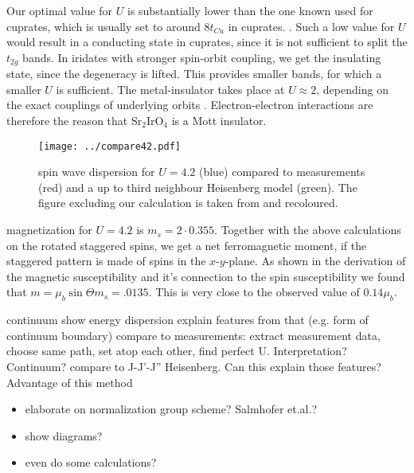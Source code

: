\documentclass[a4paper,12pt]{report}
\begin{document}
Our optimal value for $U$ is substantially lower than the one known used for cuprates, which is usually set to around 8$t_{Cu}$ in cuprates. 
.
Such a low value for $U$ would result in a conducting state in cuprates, since it is not sufficient to split the $t_{2g}$ bands. 
In iridates with stronger spin-orbit coupling, we get the insulating state, since the degeneracy is lifted.
This provides smaller bands, for which a smaller $U$ is sufficient.
The metal-insulator takes place at $U \approx 2$, depending on the exact couplings of underlying orbits \cite{PhysRevB.88.035111}.
Electron-electron interactions are therefore the reason that Sr$_2$IrO$_4$ is a Mott insulator. 
\begin{figure}
 \begin{center}
  \texttt{[image: ../compare42.pdf]}
 \caption{ spin wave dispersion for $U=4.2$ (blue) compared to measurements (red) and a up to third neighbour Heisenberg model (green). 
 The figure excluding our calculation is taken from \cite{PhysRevLett.108.177003} and recoloured.} 
 \end{center}
\label{tttU42}
\end{figure}


magnetization for $U=4.2$ is $m_s= 2\cdot 0.355$. Together with the above calculations on the rotated staggered spins, we get a net ferromagnetic moment,
if the staggered pattern is made of spins in the $x$-$y$-plane. As shown in the derivation of the magnetic susceptibility and it's connection to the spin susceptibility
we found that $m = \mu_b \sin \Theta m_s= .0135$. This is very close to the observed value of $0.14 \mu_b$.


continuum
show energy dispersion
explain features from that (e.g. form of continuum boundary)
compare to measurements: extract measurement data, choose same path, set atop each other, find perfect U. Interpretation? Continuum?
compare to J-J'-J'' Heisenberg. Can this explain those features? Advantage of this method


\begin{itemize}
\item elaborate on normalization group scheme? Salmhofer et.al.\cite{RevModPhys.84.299}?
\item show diagrams?
\item even do some calculations?
\end{itemize}



\end{document}

